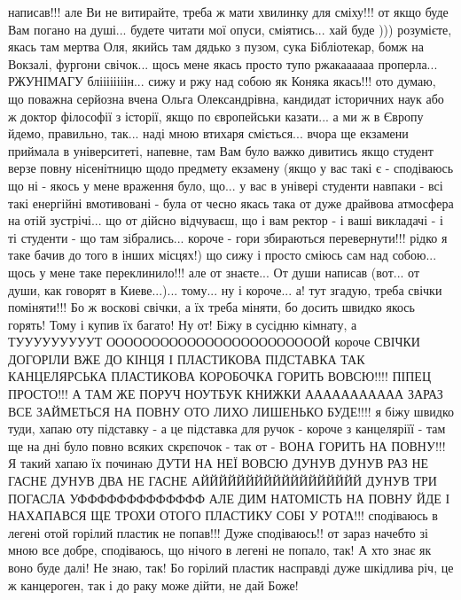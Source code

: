 написав!!!  але Ви не витирайте, треба ж мати хвилинку для сміху!!! от якщо
буде Вам погано на душі... будете читати мої опуси, сміятись... хай буде )))
розумієте, якась там мертва Оля, якийсь там дядько з пузом, сука Бібліотекар,
бомж на Вокзалі, фургони свічок... щось мене якась просто тупо ржакаааааа
проперла... РЖУНІМАГУ бліііііііін... сижу и ржу над собою як Коняка якась!!!
ото думаю, що поважна серйозна вчена Ольга Олександрівна, кандидат історичних
наук або ж доктор філософії з історії, якщо по європейськи казати...  а ми ж в
Європу йдемо, правильно, так... наді мною втихаря сміється... вчора ще екзамени
приймала в університеті, напевне, там Вам було важко дивитись якщо студент
верзе повну нісенітницю щодо предмету екзамену (якщо у вас такі є - сподіваюсь
що ні - якось у мене враження було, що... у вас в універі студенти навпаки -
всі такі енергійні вмотивовані - була от чесно якась така от дуже драйвова
атмосфера на отій зустрічі...  що от дійсно відчуваєш, що і вам ректор - і ваші
викладачі - і ті студенти - що там зібрались... короче - гори збираються
перевернути!!!  рідко я таке бачив до того в інших місцях!) що сижу і просто
сміюсь сам над собою... щось у мене таке переклинило!!! але от знаєте... От
души написав (вот... от души, как говорят в Киеве...)... тому...  ну і
короче... а! тут згадую, треба свічки поміняти!!! Бо ж воскові свічки, а їх
треба міняти, бо досить швидко якось горять! Тому і купив їх багато!  Ну от!
Біжу в сусідню кімнату, а ТУУУУУУУУУТ ООООООООООООООООООООООООЙ короче СВІЧКИ
ДОГОРІЛИ ВЖЕ ДО КІНЦЯ І ПЛАСТИКОВА ПІДСТАВКА ТАК КАНЦЕЛЯРСЬКА ПЛАСТИКОВА
КОРОБОЧКА ГОРИТЬ ВОВСЮ!!!! ПІПЕЦ ПРОСТО!!! А ТАМ ЖЕ ПОРУЧ НОУТБУК КНИЖКИ
ААААААААААА ЗАРАЗ ВСЕ ЗАЙМЕТЬСЯ НА ПОВНУ ОТО ЛИХО ЛИШЕНЬКО БУДЕ!!!!  я біжу
швидко туди, хапаю оту підставку - а це підставка для ручок - короче з
канцеляріїї - там ще на дні було повно всяких скрєпочок - так от - ВОНА ГОРИТЬ
НА ПОВНУ!!! Я такий хапаю їх починаю ДУТИ НА НЕЇ ВОВСЮ ДУНУВ ДУНУВ РАЗ НЕ ГАСНЕ
ДУНУВ ДВА НЕ ГАСНЕ АЙЙЙЙЙЙЙЙЙЙЙЙЙЙЙЙЙЙ ДУНУВ ТРИ ПОГАСЛА УФФФФФФФФФФФФФ АЛЕ ДИМ
НАТОМІСТЬ НА ПОВНУ ЙДЕ І НАХАПАВСЯ ЩЕ ТРОХИ ОТОГО ПЛАСТИКУ СОБІ У РОТА!!!
сподіваюсь в легені отой горілий пластик не попав!!!  Дуже сподіваюсь!! от
зараз начебто зі мною все добре, сподіваюсь, що нічого в легені не попало, так!
А хто знає як воно буде далі!  Не знаю, так! Бо горілий пластик насправді дуже
шкідлива річ, це ж канцероген, так і до раку може дійти, не дай Боже!

